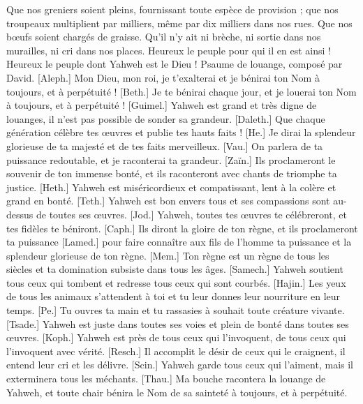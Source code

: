 \begin{multicols}{2}
Que nos greniers soient pleins, fournissant toute espèce de provision ; que nos troupeaux multiplient par milliers, même par dix milliers dans nos rues.
Que nos bœufs soient chargés de graisse. Qu'il n'y ait ni brèche, ni sortie dans nos murailles, ni cri dans nos places.
Heureux le peuple pour qui il en est ainsi ! Heureux le peuple dont Yahweh est le Dieu !
\VerseOne{}Psaume de louange, composé par David. [Aleph.] Mon Dieu, mon roi, je t'exalterai et je bénirai ton Nom à toujours, et à perpétuité !
[Beth.] Je te bénirai chaque jour, et je louerai ton Nom à toujours, et à perpétuité !
[Guimel.] Yahweh est grand et très digne de louanges, il n'est pas possible de sonder sa grandeur.
[Daleth.] Que chaque génération célèbre tes œuvres et publie tes hauts faits !
[He.] Je dirai la splendeur glorieuse de ta majesté et de tes faits merveilleux.
[Vau.] On parlera de ta puissance redoutable, et je raconterai ta grandeur.
[Zaïn.] Ils proclameront le souvenir de ton immense bonté, et ils raconteront avec chants de triomphe ta justice.
[Heth.] Yahweh est miséricordieux et compatissant, lent à la colère et grand en bonté.
[Teth.] Yahweh est bon envers tous et ses compassions sont au-dessus de toutes ses œuvres.
[Jod.] Yahweh, toutes tes œuvres te célébreront, et tes fidèles te béniront.
[Caph.] Ils diront la gloire de ton règne, et ils proclameront ta puissance
[Lamed.] pour faire connaître aux fils de l’homme ta puissance et la splendeur glorieuse de ton règne.
[Mem.] Ton règne est un règne de tous les siècles et ta domination subsiste dans tous les âges.
[Samech.] Yahweh soutient tous ceux qui tombent et redresse tous ceux qui sont courbés.
[Hajin.] Les yeux de tous les animaux s'attendent à toi et tu leur donnes leur nourriture en leur temps.
[Pe.] Tu ouvres ta main et tu rassasies à souhait toute créature vivante.
[Tsade.] Yahweh est juste dans toutes ses voies et plein de bonté dans toutes ses œuvres.
[Koph.] Yahweh est près de tous ceux qui l'invoquent, de tous ceux qui l'invoquent avec vérité.
[Resch.] Il accomplit le désir de ceux qui le craignent, il entend leur cri et les délivre.
[Scin.] Yahweh garde tous ceux qui l'aiment, mais il exterminera tous les méchants.
[Thau.] Ma bouche racontera la louange de Yahweh, et toute chair bénira le Nom de sa sainteté à toujours, et à perpétuité.

\end{multicols}
